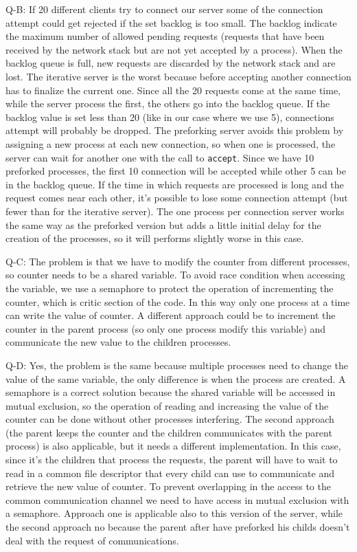Q-B: If 20 different clients try to connect our server some of the connection attempt could get rejected if the set backlog is too small. The backlog indicate the maximum number of allowed pending requests (requests that have been received by the network stack but are not yet accepted by a process). When the backlog queue is full, new requests are discarded by the network stack and are lost. The iterative server is the worst because before accepting another connection has to finalize the current one. Since all the 20 requests come at the same time, while the server process the first, the others go into the backlog queue. If the backlog value is set less than 20 (like in our case where we use 5), connections attempt will probably be dropped. The preforking server avoids this problem by assigning a new process at each new connection, so when one is processed, the server can wait for another one with the call to \texttt{accept}. Since we have 10 preforked processes, the first 10 connection will be accepted while other 5 can be in the backlog queue. If the time in which requests are processed is long and the request comes near each other, it's possible to lose some connection attempt (but fewer than for the iterative server). The one process per connection server works the same way as the preforked version but adds a little initial delay for the creation of the processes, so it will performs slightly worse in this case.

Q-C: The problem is that we have to modify the counter from different processes, so counter needs to be a shared variable. To avoid race condition when accessing the variable, we use a semaphore to protect the operation of incrementing the counter, which is critic section of the code. In this way only one process at a time can write the value of counter. A different approach could be to increment the counter in the parent process (so only one process modify this variable) and communicate the new value to the children processes.

Q-D: Yes, the problem is the same because multiple processes need to change the value of the same variable, the only difference is when the process are created. A semaphore is a correct solution because the shared variable will be accessed in mutual exclusion, so the operation of reading and increasing the value of the counter can be done without other processes interfering. The second approach (the parent keeps the counter and the children communicates with the parent process) is also applicable, but it needs a different implementation. In this case, since it's the children that process the requests, the parent will have to wait to read in a common file descriptor that every child can use to communicate and retrieve the new value of counter. To prevent overlapping in the access to the common communication channel we need to have access in mutual exclusion with a semaphore.
Approach one is applicable also to this version of the server, while the second approach no because the parent after have preforked his childs doesn't deal with the request of communications. 


